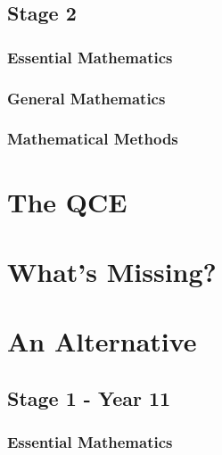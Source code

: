 \documentclass[11pt]{report}
\begin{document}
\section{Stage 2}
\subsection{Essential Mathematics}
\subsection{General Mathematics}
\subsection{Mathematical Methods}
\chapter{The QCE}


\chapter{What's Missing?}




\chapter{An Alternative}
\section{Stage 1 - Year 11}

\subsection{Essential Mathematics}
\end{document}

